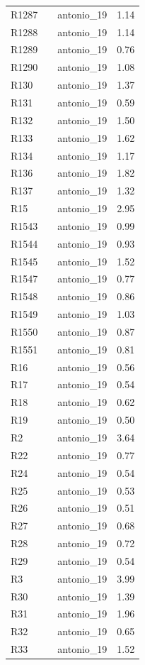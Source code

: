 \begin{longtable}[t]{lllr}
R1287 &  & antonio\_19 & 1.14\\
R1288 &  & antonio\_19 & 1.14\\
R1289 &  & antonio\_19 & 0.76\\
R1290 &  & antonio\_19 & 1.08\\
R130 &  & antonio\_19 & 1.37\\
R131 &  & antonio\_19 & 0.59\\
R132 &  & antonio\_19 & 1.50\\
R133 &  & antonio\_19 & 1.62\\
R134 &  & antonio\_19 & 1.17\\
R136 &  & antonio\_19 & 1.82\\
R137 &  & antonio\_19 & 1.32\\
R15 &  & antonio\_19 & 2.95\\
R1543 &  & antonio\_19 & 0.99\\
R1544 &  & antonio\_19 & 0.93\\
R1545 &  & antonio\_19 & 1.52\\
R1547 &  & antonio\_19 & 0.77\\
R1548 &  & antonio\_19 & 0.86\\
R1549 &  & antonio\_19 & 1.03\\
R1550 &  & antonio\_19 & 0.87\\
R1551 &  & antonio\_19 & 0.81\\
R16 &  & antonio\_19 & 0.56\\
R17 &  & antonio\_19 & 0.54\\
R18 &  & antonio\_19 & 0.62\\
R19 &  & antonio\_19 & 0.50\\
R2 &  & antonio\_19 & 3.64\\
R22 &  & antonio\_19 & 0.77\\
R24 &  & antonio\_19 & 0.54\\
R25 &  & antonio\_19 & 0.53\\
R26 &  & antonio\_19 & 0.51\\
R27 &  & antonio\_19 & 0.68\\
R28 &  & antonio\_19 & 0.72\\
R29 &  & antonio\_19 & 0.54\\
R3 &  & antonio\_19 & 3.99\\
R30 &  & antonio\_19 & 1.39\\
R31 &  & antonio\_19 & 1.96\\
R32 &  & antonio\_19 & 0.65\\
R33 &  & antonio\_19 & 1.52\\

\end{longtable}
